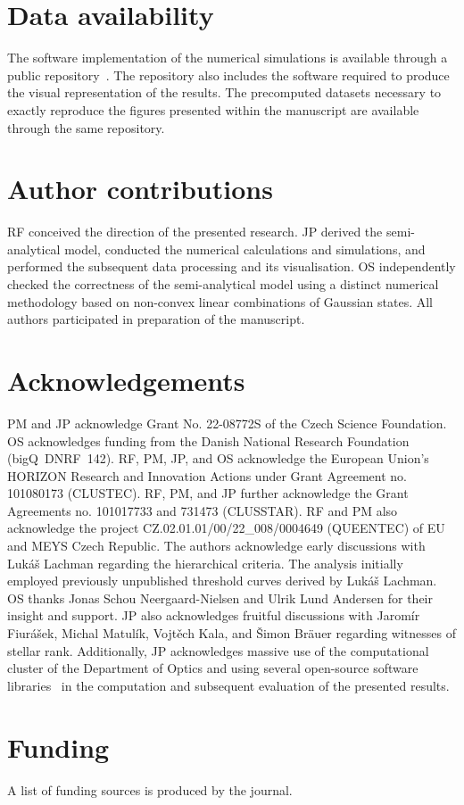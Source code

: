 \documentclass{article}
\begin{document}
%

\FloatBarrier
\section*{Data availability}

The software implementation of the numerical simulations is available through a public repository~\cite{source}. The repository also includes the software required to produce the visual representation of the results. The precomputed datasets necessary to exactly reproduce the figures presented within the manuscript are available through the same repository.

\FloatBarrier
\section*{Author contributions}
RF conceived the direction of the presented research. JP derived the semi-analytical model, conducted the numerical calculations and simulations, and performed the subsequent data processing and its visualisation. OS independently checked the correctness of the semi-analytical model using a distinct numerical methodology based on non-convex linear combinations of Gaussian states. All authors participated in preparation of the manuscript.

\FloatBarrier
\section*{Acknowledgements}

PM and JP acknowledge Grant No. 22-08772S of the Czech Science Foundation.
OS acknowledges funding from the Danish National Research Foundation (bigQ~DNRF~142).
RF, PM, JP, and OS acknowledge the European Union's HORIZON Research and Innovation Actions under Grant Agreement no. 101080173 (CLUSTEC).
RF, PM, and JP further acknowledge the Grant Agreements no. 101017733 and 731473 (CLUSSTAR).
RF and PM also acknowledge the project \mbox{CZ.02.01.01/00/22\_008/0004649} (QUEENTEC) of EU and MEYS Czech Republic. 
%
The authors acknowledge early discussions with Luk\'{a}\v{s} Lachman regarding the hierarchical criteria. The analysis initially employed previously unpublished threshold curves derived by Luk\'{a}\v{s} Lachman. 
%
OS thanks Jonas Schou Neergaard-Nielsen and Ulrik Lund Andersen for their insight and support. 
%
JP also acknowledges fruitful discussions with Jarom\'{i}r Fiur\'{a}\v{s}ek, Michal Matul\'{i}k, Vojt\v{e}ch Kala, and \v{S}imon Br\"{a}uer regarding witnesses of stellar rank. 
%
Additionally, JP acknowledges massive use of the computational cluster of the Department of Optics and using several open-source software libraries~\cite{hunter2007,harris2020,virtanen2020,dalcin2021} in the computation and subsequent evaluation of the presented results.

\FloatBarrier
\section*{Funding}

A list of funding sources is produced by the journal.

%

\FloatBarrier
\printbibliography
\end{document}
